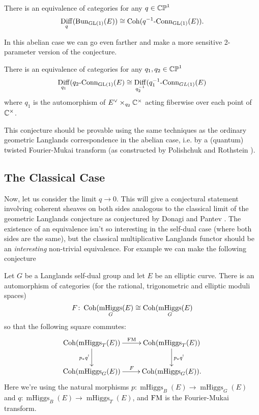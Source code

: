 \documentclass[10pt, oneside]{article}
\DeclareMathOperator{\mhiggs}{mHiggs}
\renewcommand{\conn}{\text{-Conn}}
\DeclareMathOperator{\diff}{Diff}
\begin{document}
\begin{conjecture}
There is an equivalence of categories for any $q \in \mathbb{CP}^1$
\[\diff_q(\bun_{\GL(1)}(E)) \iso \coh(q^{-1}\conn_{\GL(1)}(E)).\]
\end{conjecture}

In this abelian case we can go even farther and make a more sensitive 2-parameter version of the conjecture.

\begin{conjecture}
There is an equivalence of categories for any $q_1, q_2 \in \mathbb{CP}^1$
\[\diff_{q_1}(q_2\conn_{\GL(1)}(E) \iso \diff_{q_2^{-1}}(q_1^{-1}\conn_{GL(1)}(E)\]
where $q_1$ is the automorphism of $E^\vee \times_{q_2} \mathbb{C}^\times$ acting fiberwise over each point of $\mathbb{C}^\times$.
\end{conjecture}

This conjecture should be provable using the same techniques as the ordinary geometric Langlands correspondence in the abelian case, i.e. by a (quantum) twisted Fourier-Mukai transform (as constructed by Polishchuk and Rothstein \cite{PolishchukRothstein}).

\subsection{The Classical Case}
Now, let us consider the limit $q \to 0$.  This will give a conjectural statement involving coherent sheaves on both sides analogous to the classical limit of the geometric Langlands conjecture as conjectured by Donagi and Pantev \cite{DonagiPantev}.  The existence of an equivalence isn't so interesting in the self-dual case (where both sides are the same), but the classical multiplicative Langlands functor should be an \emph{interesting} non-trivial equivalence.  For example we can make the following conjecture

\begin{conjecture}
Let $G$ be a Langlands self-dual group and let $E$ be an elliptic curve.  There is an automorphism of categories (for the rational, trigonometric and elliptic moduli spaces)
\[F \colon \coh(\mhiggs_G(E) \iso \coh(\mhiggs_{G}(E)\]
so that the following square commutes:
\[\xymatrix{
\coh(\mhiggs_T(E)) \ar[r]^{\mathrm{FM}} \ar[d]_{p_*q^!} &\coh(\mhiggs_T(E)) \ar[d]^{p_*q^!} \\
\coh(\mhiggs_G(E)) \ar[r]^{F} &\coh(\mhiggs_G(E)).
}\]
Here we're using the natural morphisms $p \colon \mhiggs_B(E) \to \mhiggs_G(E)$ and $q \colon \mhiggs_B(E) \to \mhiggs_T(E)$, and $\mathrm{FM}$ is the Fourier-Mukai transform.
\end{conjecture}
\end{document}
